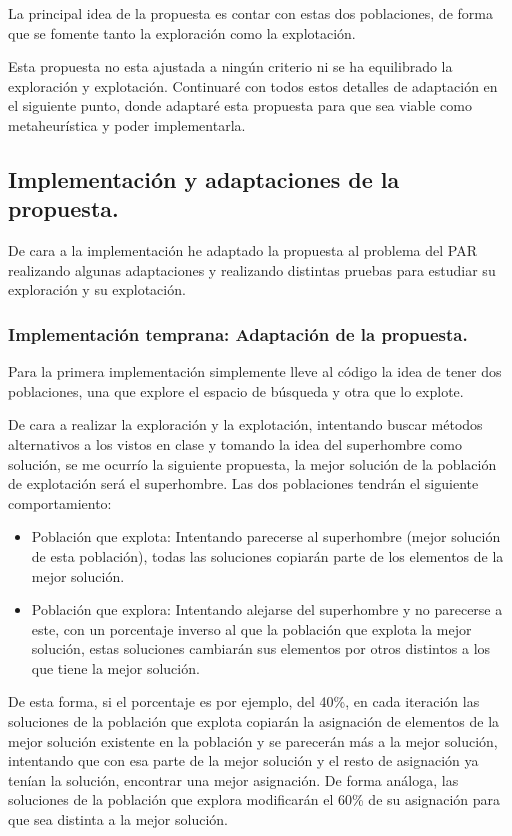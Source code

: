 \documentclass[12pt, spanish]{article}
\begin{document}
La principal idea de la propuesta es contar con estas dos poblaciones, de forma que se fomente tanto la exploración como la explotación.

Esta propuesta no esta ajustada a ningún criterio ni se ha equilibrado la exploración y explotación. Continuaré con todos estos detalles de adaptación en el siguiente punto, donde adaptaré esta propuesta para que sea viable como metaheurística y poder implementarla.
 

\subsection{Implementación y adaptaciones de la propuesta.}

De cara a la implementación he adaptado la propuesta al problema del PAR realizando algunas adaptaciones y realizando distintas pruebas para estudiar su exploración y su explotación.

\subsubsection{Implementación temprana: Adaptación de la propuesta.}

Para la primera implementación simplemente lleve al código la idea de tener dos poblaciones, una que explore el espacio de búsqueda y otra que lo explote.

De cara a realizar la exploración y la explotación, intentando buscar métodos alternativos a los vistos en clase y tomando la idea del superhombre como solución, se me ocurrío la siguiente propuesta, la mejor solución de la población de explotación será el superhombre. Las dos poblaciones tendrán el siguiente comportamiento:

\begin{itemize}
	\item Población que explota: Intentando parecerse al superhombre (mejor solución de esta población), todas las soluciones copiarán parte de los elementos de la mejor solución.
	\item Población que explora: Intentando alejarse del superhombre y no parecerse a este, con un porcentaje inverso al que la población que explota la mejor solución, estas soluciones cambiarán sus elementos por otros distintos a los que tiene la mejor solución.
\end{itemize} 

De esta forma, si el porcentaje es por ejemplo, del 40\%, en cada iteración las soluciones de la población que explota copiarán la asignación de elementos de la mejor solución existente en la población y se parecerán más a la mejor solución, intentando que con esa parte de la mejor solución y el resto de asignación ya tenían la solución, encontrar una mejor asignación. De forma análoga, las soluciones de la población que explora modificarán el 60\% de su asignación para que sea distinta a la mejor solución.
\end{document}
